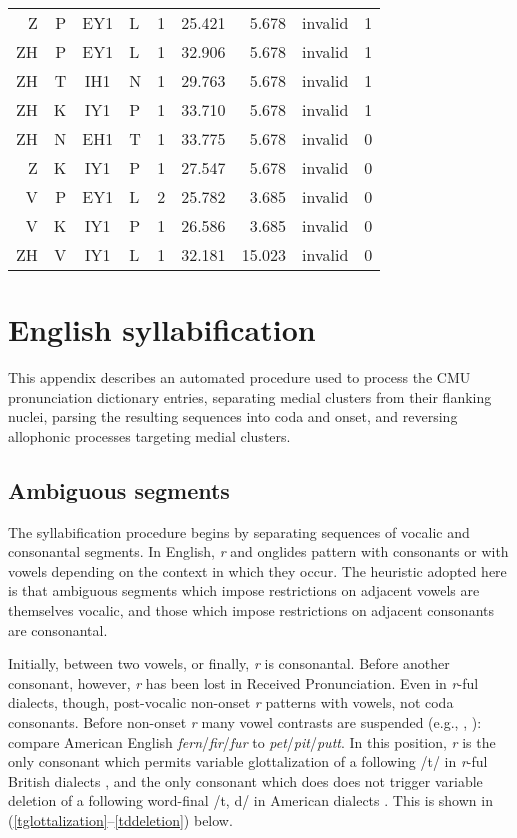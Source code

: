\documentclass[12pt]{article}
\begin{document}
\begin{longtable}{r@{ }r@{ }c@{ }l@{ } rrrrr}
 Z & P & EY1 & L & 1 & 25.421 &  5.678 & invalid & 1 \\
ZH & P & EY1 & L & 1 & 32.906 &  5.678 & invalid & 1 \\
ZH & T & IH1 & N & 1 & 29.763 &  5.678 & invalid & 1 \\
ZH & K & IY1 & P & 1 & 33.710 &  5.678 & invalid & 1 \\
ZH & N & EH1 & T & 1 & 33.775 &  5.678 & invalid & 0 \\
 Z & K & IY1 & P & 1 & 27.547 &  5.678 & invalid & 0 \\
 V & P & EY1 & L & 2 & 25.782 &  3.685 & invalid & 0 \\
 V & K & IY1 & P & 1 & 26.586 &  3.685 & invalid & 0 \\
ZH & V & IY1 & L & 1 & 32.181 & 15.023 & invalid & 0 \\
\bottomrule
\end{longtable}

\section{English syllabification}
\label{syllabification}

This appendix describes an automated procedure used to process the CMU pronunciation dictionary entries, separating medial clusters from their flanking nuclei, parsing the resulting sequences into coda and onset, and reversing allophonic processes targeting medial clusters.

\subsection{Ambiguous segments}

The syllabification procedure begins by separating sequences of vocalic and consonantal segments. In English, \emph{r} and onglides pattern with consonants or with vowels depending on the context in which they occur. The heuristic adopted here is that ambiguous segments which impose restrictions on adjacent vowels are themselves vocalic, and those which impose restrictions on adjacent consonants are consonantal.

Initially, between two vowels, or finally, \emph{r} is consonantal. Before another consonant, however, \emph{r} has been lost in Received Pronunciation. Even in \emph{r}-ful dialects, though, post-vocalic non-onset \emph{r} patterns with vowels, not coda consonants. Before non-onset \emph{r} many vowel contrasts are suspended (e.g., \citealp[269f.]{Fudge1969}, \citealp[][255]{Harris1994}): compare American English \emph{fern}/\emph{fir}/\emph{fur} to \emph{pet}/\emph{pit}/\emph{putt}. In this position, \emph{r} is the only consonant which permits variable glottalization of a following /t/ in \emph{r}-ful British dialects \citep[258]{Harris1994}, and the only consonant which does does not trigger variable deletion of a following word-final /t, d/ in American dialects \citep[8]{Guy1980}. This is shown in (\ref{tglottalization}--\ref{tddeletion}) below.
\end{document}
